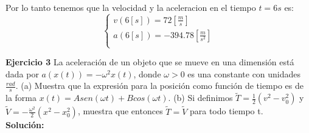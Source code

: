 \documentclass[a4paper,11pt]{scrartcl}
\begin{document}
\begin{center}
Por lo tanto tenemos que la velocidad y la aceleracion en el tiempo $t = 6s$ es:\\

\begin{equation}
  \left\lbrace
  \begin{array}{l}
     v(6[s]) = 72[ \frac{m}{s}]\\
     a(6[s]) = - 394.78 [ \frac{m}{s^{2}}]\\
  \end{array}
  \right.
\end{equation}

\end{center}

\textbf{Ejercicio 3} La aceleración de un objeto que se mueve en una dimensión está dada por $a( x(t) ) = - \omega^{2}x(t)$, donde $\omega > 0$ es una constante con unidades $\frac{rad}{s}$. (a) Muestra  que  la expresión para la posición como función de tiempo es de la forma $x(t) = A sen ( \omega t ) + B cos ( \omega t )$. (b) Si definimos $\widetilde{T} = \frac{1}{2}(v^{2}-v_0^{2})$ y $\widetilde{V} = -\frac{\omega^{2}}{2}(x^{2}-x_0^{2})$, muestra que entonces $\widetilde{T} = \widetilde{V}$ para todo tiempo t.\\

\textbf{Solución:}
\end{document}
